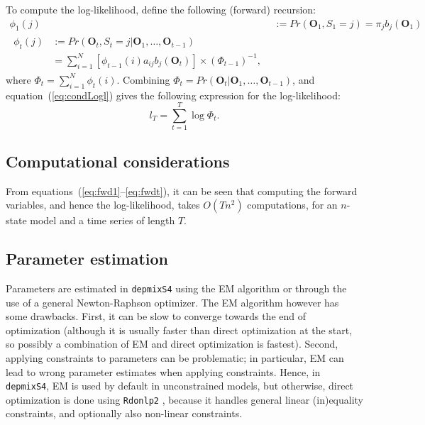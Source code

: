 \documentclass[a4paper]{article}
\newcommand{\vc}{\mathbf}
\newcommand{\pkg}{\texttt}
\begin{document}
To compute the log-likelihood, \cite{Lystig2002} define the following 
(forward) recursion:
\begin{align}
	\phi_{1}(j) &:= Pr(\vc{O}_{1}, S_{1}=j) = \pi_{j} b_{j}(\vc{O}_{1}) 
	\label{eq:fwd1} \\
\begin{split}
	\phi_{t}(j) &:= Pr(\vc{O}_{t}, S_{t}=j|\vc{O}_{1}, \ldots, 
\vc{O}_{t-1}) \\
	&= \sum_{i=1}^{N} [\phi_{t-1}(i)a_{ij}b_{j}(\vc{O}_{t})] \times 
(\Phi_{t-1})^{-1},
	\label{eq:fwdt} 
\end{split} 
\end{align}
where $\Phi_{t}=\sum_{i=1}^{N} \phi_{t}(i)$. Combining 
$\Phi_{t}=Pr(\vc{O}_{t}|\vc{O}_{1}, \ldots, \vc{O}_{t-1})$, and 
equation~(\ref{eq:condLogl}) gives the following expression for the 
log-likelihood:
\begin{equation}
	l_{T} = \sum_{t=1}^{T} \log \Phi_{t}.
	\label{eq:logl}
\end{equation}

\subsection{Computational considerations} From
equations~(\ref{eq:fwd1}--\ref{eq:fwdt}), it can be seen that
computing the forward variables, and hence the log-likelihood, takes
$O(Tn^{2})$ computations, for an $n$-state model and a time series of
length $T$.

\subsection{Parameter estimation}

Parameters are estimated in \pkg{depmixS4} using the EM algorithm or
through the use of a general Newton-Raphson optimizer.  The EM
algorithm however has some drawbacks.  First, it can be slow to
converge towards the end of optimization (although it is usually
faster than direct optimization at the start, so possibly a
combination of EM and direct optimization is fastest).  Second,
applying constraints to parameters can be problematic; in particular,
EM can lead to wrong parameter estimates when applying constraints.
Hence, in \pkg{depmixS4}, EM is used by default in unconstrained
models, but otherwise, direct optimization is done using \pkg{Rdonlp2}
\cite{Tamura2007,Spellucci2002}, because it handles general linear
(in)equality constraints, and optionally also non-linear constraints.
\end{document}
